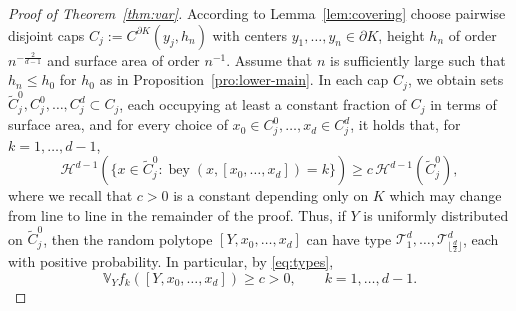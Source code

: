 \documentclass[12pt]{article}
\DeclareMathOperator{\bey}{bey}
\def\V{{\mathds V}}
\def\cH{{\mathcal H}}
\def\cT{{\mathcal T}}
\def\bd{{\partial}}
\theoremstyle{definition}
\begin{document}
\begin{proof}[Proof of Theorem~\ref{thm:var}]
	According to Lemma~\ref{lem:covering} choose pairwise disjoint caps $C_j:=C^{\partial K}(y_j,h_n)$ with centers $y_1,\dots,y_n\in \bd K$, height $h_n$ of order $n^{-\frac{2}{d-1}}$ and surface area of order $n^{-1}$. Assume that $n$ is sufficiently large such that $h_n\le h_0$ for $h_0$ as in Proposition~\ref{pro:lower-main}. In each cap $C_j$, we obtain sets $\tilde{C}^0_j,C^0_j,\dots,C^d_j\subset C_j$, each occupying at least a constant fraction of $C_j$ in terms of surface area,  and for every choice of $x_0\in C^0_j,\dots, x_d\in C^d_j$, it holds that, for $k=1,\dots,d-1$,
\[
\cH^{d-1}(\{x\in \tilde{C}_j^0\colon \bey(x,[x_0,\dots,x_d])=k\})
\ge c \,\cH^{d-1}(\tilde{C}_j^0),
\]
where we recall that $c>0$ is a constant depending only on $K$ which may change from line to line in the remainder of the proof.  Thus, if $Y$ is uniformly distributed on $\tilde{C}_j^0$, then the random polytope $[Y,x_0,\dots,x_d]$ can have type $\cT^d_1,\dots,\cT^d_{\lfloor \frac{d}{2}\rfloor}$, each with positive probability. In particular, by \eqref{eq:types},
\[
\V_Y f_k([Y,x_0,\dots,x_{d}])\ge c>0,\qquad k=1,\dots,d-1.
\]


\end{proof}
\end{document}
